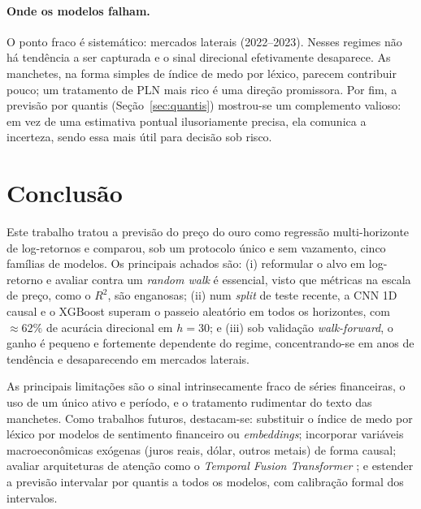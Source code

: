 \documentclass[12pt]{article}
\begin{document}
\paragraph{Onde os modelos falham.} O ponto fraco é sistemático: mercados
laterais (2022--2023). Nesses regimes não há tendência a ser capturada e o sinal
direcional efetivamente desaparece. As manchetes, na forma simples de índice de
medo por léxico, parecem contribuir pouco; um tratamento de PLN mais rico é uma
direção promissora. Por fim, a previsão por quantis (Seção~\ref{sec:quantis})
mostrou-se um complemento valioso: em vez de uma estimativa pontual ilusoriamente
precisa, ela comunica a incerteza, sendo essa mais útil para decisão sob risco.

\section{Conclusão}
\label{sec:conclusao}

Este trabalho tratou a previsão do preço do ouro como regressão multi-horizonte
de log-retornos e comparou, sob um protocolo único e sem vazamento, cinco
famílias de modelos. Os principais achados são: (i) reformular o alvo em
log-retorno e avaliar contra um \emph{random walk} é essencial, visto que métricas na
escala de preço, como o $R^2$, são enganosas; (ii) num \emph{split} de teste
recente, a CNN 1D causal e o XGBoost superam o passeio aleatório em todos os
horizontes, com $\approx 62\%$ de acurácia direcional em $h=30$; e (iii) sob
validação \emph{walk-forward}, o ganho é pequeno e fortemente dependente do
regime, concentrando-se em anos de tendência e desaparecendo em mercados
laterais.

As principais limitações são o sinal intrinsecamente fraco de séries
financeiras, o uso de um único ativo e período, e o tratamento rudimentar do
texto das manchetes. Como trabalhos futuros, destacam-se: substituir o índice de
medo por léxico por modelos de sentimento financeiro ou \emph{embeddings};
incorporar variáveis macroeconômicas exógenas (juros reais, dólar, outros
metais) de forma causal; avaliar arquiteturas de atenção como o \emph{Temporal
Fusion Transformer} \cite{lim2021tft}; e estender a previsão intervalar por
quantis a todos os modelos, com calibração formal dos intervalos.

\end{document}
